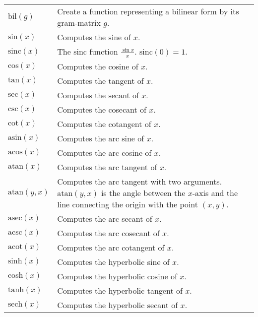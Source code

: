 \documentclass[10pt]{article}
\newcommand{\tabgap}{\vspace{3mm}\\}
\begin{document}
\begin{longtable}{p{}p{}}
        $ \mathrm{bil}(g) $                        & Create a function representing a bilinear form by its gram-matrix $ g $. \tabgap
        $ \mathrm{sin}(x) $                        & Computes the sine of $ x $. \\
        $ \mathrm{sinc}(x) $                       & The $ \mathrm{sinc} $ function $ \frac{\sin x}{x} $. $ \mathrm{sinc}(0) = 1 $. \\
        $ \mathrm{cos}(x) $                        & Computes the cosine of $ x $. \\
        $ \mathrm{tan}(x) $                        & Computes the tangent of $ x $. \\
        $ \mathrm{sec}(x) $                        & Computes the secant of $ x $. \\
        $ \mathrm{csc}(x) $                        & Computes the cosecant of $ x $. \\
        $ \mathrm{cot}(x) $                        & Computes the cotangent of $ x $. \\
        $ \mathrm{asin}(x) $                       & Computes the arc sine of $ x $. \\
        $ \mathrm{acos}(x) $                       & Computes the arc cosine of $ x $. \\
        $ \mathrm{atan}(x) $                       & Computes the arc tangent of $ x $. \\
        $ \mathrm{atan}(y, x) $                    & Computes the arc tangent with two arguments. $ \mathrm{atan}(y, x) $ is the angle between the $ x $-axis and the line connecting the origin with the point $ (x, y) $. \\
        $ \mathrm{asec}(x) $                       & Computes the arc secant of $ x $. \\
        $ \mathrm{acsc}(x) $                       & Computes the arc cosecant of $ x $. \\
        $ \mathrm{acot}(x) $                       & Computes the arc cotangent of $ x $. \\
        $ \mathrm{sinh}(x) $                       & Computes the hyperbolic sine of $ x $. \\
        $ \mathrm{cosh}(x) $                       & Computes the hyperbolic cosine of $ x $. \\
        $ \mathrm{tanh}(x) $                       & Computes the hyperbolic tangent of $ x $. \\
        $ \mathrm{sech}(x) $                       & Computes the hyperbolic secant of $ x $. \\

\end{longtable}
\end{document}
